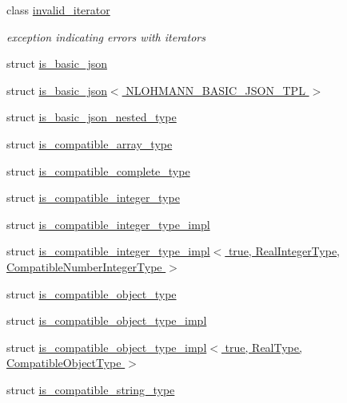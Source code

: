 \begin{DoxyCompactItemize}
class \hyperlink{classnlohmann_1_1detail_1_1invalid__iterator}{invalid\+\_\+iterator}
\begin{DoxyCompactList}\small\item\em exception indicating errors with iterators \end{DoxyCompactList}\item 
struct \hyperlink{structnlohmann_1_1detail_1_1is__basic__json}{is\+\_\+basic\+\_\+json}
\item 
struct \hyperlink{structnlohmann_1_1detail_1_1is__basic__json_3_01_n_l_o_h_m_a_n_n___b_a_s_i_c___j_s_o_n___t_p_l_01_4}{is\+\_\+basic\+\_\+json$<$ N\+L\+O\+H\+M\+A\+N\+N\+\_\+\+B\+A\+S\+I\+C\+\_\+\+J\+S\+O\+N\+\_\+\+T\+P\+L $>$}
\item 
struct \hyperlink{structnlohmann_1_1detail_1_1is__basic__json__nested__type}{is\+\_\+basic\+\_\+json\+\_\+nested\+\_\+type}
\item 
struct \hyperlink{structnlohmann_1_1detail_1_1is__compatible__array__type}{is\+\_\+compatible\+\_\+array\+\_\+type}
\item 
struct \hyperlink{structnlohmann_1_1detail_1_1is__compatible__complete__type}{is\+\_\+compatible\+\_\+complete\+\_\+type}
\item 
struct \hyperlink{structnlohmann_1_1detail_1_1is__compatible__integer__type}{is\+\_\+compatible\+\_\+integer\+\_\+type}
\item 
struct \hyperlink{structnlohmann_1_1detail_1_1is__compatible__integer__type__impl}{is\+\_\+compatible\+\_\+integer\+\_\+type\+\_\+impl}
\item 
struct \hyperlink{structnlohmann_1_1detail_1_1is__compatible__integer__type__impl_3_01true_00_01_real_integer_type78b0ba77f36a8c8169cdb79b01d1a4bf}{is\+\_\+compatible\+\_\+integer\+\_\+type\+\_\+impl$<$ true, Real\+Integer\+Type, Compatible\+Number\+Integer\+Type $>$}
\item 
struct \hyperlink{structnlohmann_1_1detail_1_1is__compatible__object__type}{is\+\_\+compatible\+\_\+object\+\_\+type}
\item 
struct \hyperlink{structnlohmann_1_1detail_1_1is__compatible__object__type__impl}{is\+\_\+compatible\+\_\+object\+\_\+type\+\_\+impl}
\item 
struct \hyperlink{structnlohmann_1_1detail_1_1is__compatible__object__type__impl_3_01true_00_01_real_type_00_01_compatible_object_type_01_4}{is\+\_\+compatible\+\_\+object\+\_\+type\+\_\+impl$<$ true, Real\+Type, Compatible\+Object\+Type $>$}
\item 
struct \hyperlink{structnlohmann_1_1detail_1_1is__compatible__string__type}{is\+\_\+compatible\+\_\+string\+\_\+type}

\end{DoxyCompactItemize}
